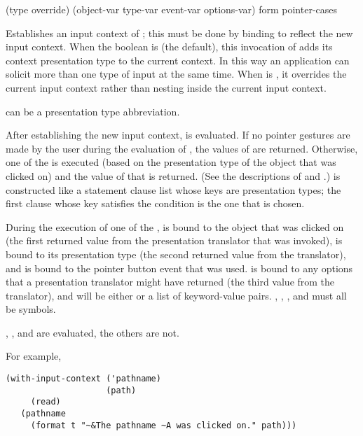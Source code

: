  {(type \key override)
                                (\optional object-var type-var event-var options-var)
                                form
                                \body pointer-cases} 

Establishes an input context of  ; this must
be done by binding  to reflect the new input context.  When
the boolean  is  (the default), this invocation of
 adds its context presentation type to the current
context.  In this way an application can solicit more than one type of input at
the same time.  When  is , it overrides the current
input context rather than nesting inside the current input context.

 can be a presentation type abbreviation.

After establishing the new input context,  is evaluated.  If no
pointer gestures are made by the user during the evaluation of , the
values of  are returned.  Otherwise, one of the  is
executed (based on the presentation type of the object that was clicked on) and
the value of that is returned.  (See the descriptions of
 and .)
 is constructed like a  statement clause list whose
keys are presentation types; the first clause whose key satisfies the condition
 is the one that is chosen.

During the execution of one of the ,  is
bound to the object that was clicked on (the first returned value from the
presentation translator that was invoked),  is bound to its
presentation type (the second returned value from the translator), and
 is bound to the pointer button event that was used.
 is bound to any options that a presentation translator might
have returned (the third value from the translator), and will be either 
or a list of keyword-value pairs.  , ,
, and  must all be symbols.

, , and  are evaluated, the others are not.

For example,
\begin{verbatim}
(with-input-context ('pathname)
                    (path)
     (read)
   (pathname
     (format t "~&The pathname ~A was clicked on." path)))
\end{verbatim}


